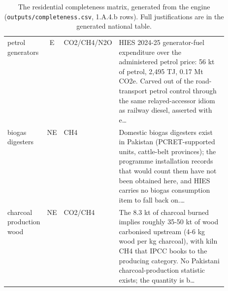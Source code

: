 \begin{table}[htbp]
\begin{tabular}{@{}lclp{0.52\linewidth}@{}}
petrol generators & E & CO2/CH4/N2O & HIES 2024-25 generator-fuel expenditure over the administered petrol price: 56 kt of petrol, 2,495 TJ, 0.17 Mt CO2e. Carved out of the road-transport petrol control through the same relayed-accessor idiom as railway diesel, asserted with e\ldots \\[2pt]
biogas digesters & NE & CH4 & Domestic biogas digesters exist in Pakistan (PCRET-supported units, cattle-belt provinces); the programme installation records that would count them have not been obtained here, and HIES carries no biogas consumption item to fall back on.\ldots \\[2pt]
charcoal production wood & NE & CO2/CH4 & The 8.3 kt of charcoal burned implies roughly 35-50 kt of wood carbonised upstream (4-6 kg wood per kg charcoal), with kiln CH4 that IPCC books to the producing category. No Pakistani charcoal-production statistic exists; the quantity is b\ldots \\[2pt]
\bottomrule
\end{tabular}
\caption{The residential completeness matrix, generated from the engine
(\texttt{outputs/completeness.csv}, 1.A.4.b rows). Full justifications
are in the generated national table.}
\label{tab:completeness144b}
\end{table}

